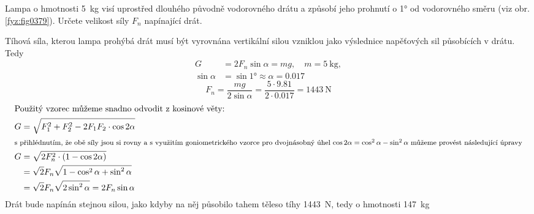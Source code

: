 \begin{mdframed}[style=mdexam]
  \begin{example}\label{fyz:fey_exam011}
    Lampa o hmotnosti \qty{5}{\kg} visí uprostřed dlouhého původně vodorovného drátu a způsobí jeho
    prohnutí o \ang{1} od vodorovného směru (viz obr. \ref{fyz:fig0379}). Určete velikost síly
    \(F_n\) napínající drát. 
        
    {\centering
    \captionsetup{type=figure}
    \par}
    
    Tíhová síla, kterou lampa prohýbá drát musí být vyrovnána vertikální silou vzniklou jako
    výslednice napěťových sil působících v drátu. Tedy
    \begin{align*}
               G &= 2F_n\sin\alpha = mg, \quad m = \qty{5}{\kg},   \\
      \sin\alpha &= \sin\ang{1} \approx \alpha = \num{0.017}
    \end{align*}
    \begin{equation*}
      F_n = \frac{mg}{2\sin\alpha} = \frac{\num{5}\cdot\num{9.81}}{2\cdot\num{0.017}}
          = \qty{1443}{\newton}
    \end{equation*}
    \begin{align*}
      \shortintertext{Použitý vzorec můžeme snadno odvodit z kosinové věty:}
      G &= \sqrt{F_1^2 + F_2^2 - 2F_1F_2\cdot\cos2\alpha}   \\
      \shortintertext{\footnotesize s přihlédnutím, že obě síly jsou si rovny a s využitím  
        goniometrického vzorce pro dvojnásobný úhel \(\cos2\alpha = \cos^2\alpha - \sin^2\alpha\) 
        můžeme provést následující úpravy} 
      G &= \sqrt{2F_n^2\cdot(1-\cos2\alpha)}                 \\
        &=\sqrt{2}F_n\sqrt{1-\cos^2\alpha+\sin^2\alpha}      \\
        &=\sqrt{2}F_n\sqrt{2\sin^2\alpha} = 2F_n\sin\alpha
    \end{align*}
    Drát bude napínán stejnou silou, jako kdyby na něj působilo tahem těleso tíhy
    \qty{1443}{\newton}, tedy o hmotnosti \qty{147}{\kg}
  \end{example}
\end{mdframed}  